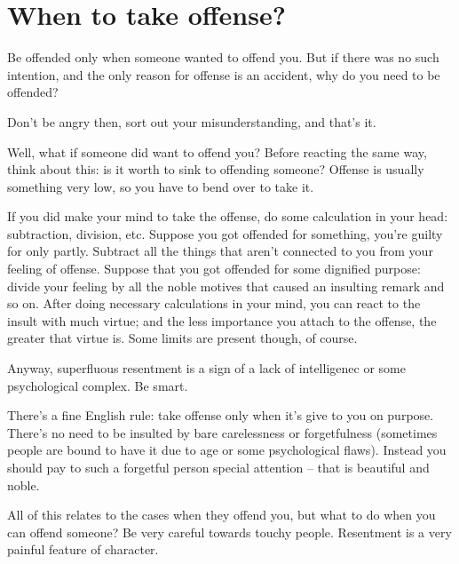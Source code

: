 \chapter{When to take offense?}

Be offended only when someone wanted to offend you. But if there was no such intention, and the only reason for offense is an accident, why do you need to be offended?

Don't be angry then, sort out your misunderstanding, and that's it.

Well, what if someone did want to offend you? Before reacting the same way, think about this: is it worth to sink to offending someone? Offense is usually something very low, so you have to bend over to take it.

If you did make your mind to take the offense, do some calculation in your head: subtraction, division, etc. Suppose you got offended for something, you're guilty for only partly. Subtract all the things that aren't connected to you from your feeling of offense. Suppose that you got offended for some dignified purpose: divide your feeling by all the noble motives that caused an insulting remark and so on. After doing necessary calculations in your mind, you can react to the insult with much virtue; and the less importance you attach to the offense, the greater that virtue is. Some limits are present though, of course.

Anyway, superfluous resentment is a sign of a lack of intelligenec or some psychological complex. Be smart.

There's a fine English rule: take offense only when it's give to you on purpose. There's no need to be insulted by bare carelessness or forgetfulness (sometimes people are bound to have it due to age or some psychological flaws). Instead you should pay to such a forgetful person special attention -- that is beautiful and noble.

All of this relates to the cases when they offend you, but what to do when you can offend someone? Be very careful towards touchy people. Resentment is a very painful feature of character. 